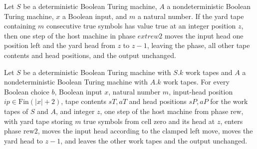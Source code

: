 \begin{theorem}
\label{Turing.ClockHost.rew2_step}
\leanok
{}
Let $S$ be a deterministic Boolean Turing machine, $A$ a nondeterministic Boolean Turing
machine, $x$ a Boolean input, and $m$ a natural number. If the yard tape containing $m$
consecutive true symbols has value true at an integer position $z$, then one step of the
host machine in phase $	ext{rew2}$ moves the input head one position left and the yard
head from $z$ to $z-1$, leaving the phase, all other tape contents and head positions,
and the output unchanged.
\end{theorem}

\begin{theorem}
\label{Turing.ClockHost.rew_step}
\leanok
{}
Let $S$ be a deterministic Boolean Turing machine with $S.k$ work tapes and $A$ a
nondeterministic Boolean Turing machine with $A.k$ work tapes. For every Boolean choice
$b$, Boolean input $x$, natural number $m$, input-head position $ip \in
\mathrm{Fin}(|x|+2)$, tape contents $sT,aT$ and head positions $sP,aP$ for the work
tapes of $S$ and $A$, and integer $z$, one step of the host machine from phase
$\mathrm{rew}$, with yard tape storing $m$ true symbols from cell zero and its head at
$z$, enters phase $\mathrm{rew2}$, moves the input head according to the clamped left
move, moves the yard head to $z-1$, and leaves the other work tapes and the output
unchanged.
\end{theorem}

